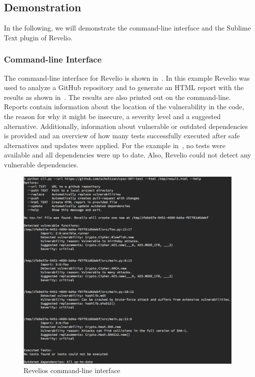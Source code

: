 \subsection{Demonstration}

In the following, we will demonstrate the command-line interface and the Sublime Text plugin of Revelio.

\subsubsection{Command-line Interface}

The command-line interface for Revelio is shown in~. In this example Revelio was used to analyze a GitHub repository and to generate an HTML report with the results as shown in~. The results are also printed out on the command-line. Reports contain information about the location of the vulnerability in the code, the reason for why it might be insecure, a severity level and a suggested alternative. Additionally, information about vulnerable or outdated dependencies is provided and an overview of how many tests successfully executed after safe alternatives and updates were applied. For the example in~, no tests were available and all dependencies were up to date. Also, Revelio could not detect any vulnerable dependencies.


\begin{figure}[h]
\centering
\includegraphics[width=\linewidth]{"figures/command-line"}
\caption{Revelios command-line interface}
\label{fig:command-line}
\end{figure}



